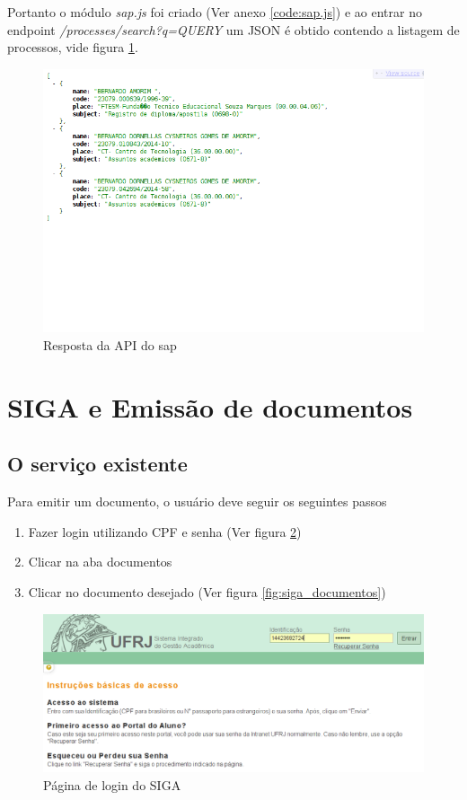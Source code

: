 Portanto o módulo \textit{sap.js} foi criado (Ver anexo \ref{code:sap.js}) e ao entrar no endpoint \textit{/processes/search?q=QUERY} um JSON é obtido contendo a listagem de processos, vide figura \ref{fig:api_sap}.

\begin{figure}[H]
\centering
	\includegraphics[width=\textwidth]{api_sap.png}
  \caption{Resposta da API do sap}
  \label{fig:api_sap}
\end{figure}

\section{SIGA e Emissão de documentos}


\subsection{O serviço existente}

Para emitir um documento, o usuário deve seguir os seguintes passos

\begin{enumerate}
  \item Fazer login utilizando CPF e senha (Ver figura \ref{fig:siga_login})
  \item Clicar na aba documentos
  \item Clicar no documento desejado (Ver figura \ref{fig:siga_documentos})
\end{enumerate}

\begin{figure}[!ht]
\centering
	\includegraphics[width=\textwidth]{siga_login.png}
  \caption{Página de login do SIGA}
  \label{fig:siga_login}
\end{figure}

